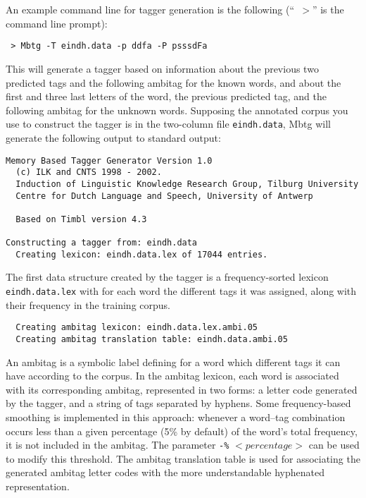 \documentclass{report}
\begin{document}
An example command line for tagger generation is the following (``{\tt
$>$}'' is the command line prompt):

{\small
\begin{verbatim}
 > Mbtg -T eindh.data -p ddfa -P psssdFa
\end{verbatim}
}

This will generate a tagger based on information about the previous
two predicted tags and the following ambitag for the known words, and
about the first and three last letters of the word, the previous predicted
tag, and the following ambitag for the unknown words. Supposing the
annotated corpus you use to construct the tagger is in the two-column
file {\tt eindh.data}, Mbtg will generate the following output
to standard output:

{\small
\begin{verbatim}
Memory Based Tagger Generator Version 1.0
  (c) ILK and CNTS 1998 - 2002.
  Induction of Linguistic Knowledge Research Group, Tilburg University
  Centre for Dutch Language and Speech, University of Antwerp

  Based on Timbl version 4.3

Constructing a tagger from: eindh.data
  Creating lexicon: eindh.data.lex of 17044 entries.
\end{verbatim}
}

The first data structure created by the tagger is a frequency-sorted
lexicon {\tt eindh.data.lex} with for each word the different tags it
was assigned, along with their frequency in the training corpus. 

{\small
\begin{verbatim}
  Creating ambitag lexicon: eindh.data.lex.ambi.05
  Creating ambitag translation table: eindh.data.ambi.05
\end{verbatim}
}

An ambitag is a symbolic label defining for a word which different
tags it can have according to the corpus.  In the ambitag lexicon,
each word is associated with its corresponding ambitag, represented in
two forms: a letter code generated by the tagger, and a string of tags
separated by hyphens. Some frequency-based smoothing is implemented in
this approach: whenever a word--tag combination occurs less than a
given percentage (5\% by default) of the word's total frequency, it is
not included in the ambitag. The parameter {\tt -\%} $<percentage>$ can be
used to modify this threshold. The ambitag translation table is used
for associating the generated ambitag letter codes with the more
understandable hyphenated representation.
\end{document}
